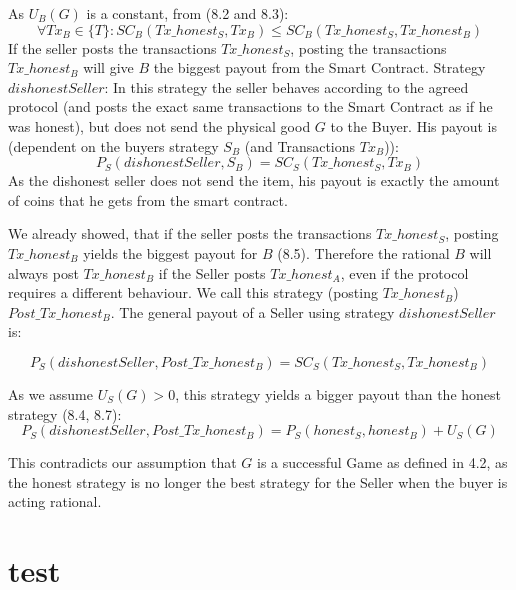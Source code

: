 \documentclass{cacthesis}
\begin{document}
As $U_B(G)$ is a constant, from (8.2 and 8.3):
\begin{equation}
    \forall Tx_B \in \{T\}: SC_B(Tx\_honest_S, Tx_B) \leq SC_B(Tx\_honest_S, Tx\_honest_B)
\end{equation}
If the seller posts the transactions $Tx\_honest_S$, posting the transactions $Tx\_honest_B$ will give $B$ the biggest payout from the Smart Contract.
Strategy $dishonestSeller$: In this strategy the seller behaves according to the agreed protocol (and posts the exact same transactions to the Smart Contract as if he was honest), but does not send the physical good $G$ to the Buyer.\newline
His payout is (dependent on the buyers strategy $S_B$ (and Transactions $Tx_B$)):
\begin{equation}
    P_S(dishonestSeller,S_B) = SC_S(Tx\_honest_S,Tx_B)
\end{equation}
As the dishonest seller does not send the item, his payout is exactly the amount of coins that he gets from the smart contract.\newline

We already showed, that if the seller posts the transactions $Tx\_honest_S$, posting $Tx\_honest_B$ yields the biggest payout for $B$ (8.5).\newline
Therefore the rational $B$ will always post $Tx\_honest_B$ if the Seller posts $Tx\_honest_A$, even if the protocol requires a different behaviour. We call this strategy (posting $Tx\_honest_B$) $Post\_Tx\_honest_B$.\newline
The general payout of a Seller using strategy $dishonestSeller$ is:

\begin{equation}
    P_S(dishonestSeller,Post\_Tx\_honest_B) = SC_S(Tx\_honest_S,Tx\_honest_B)
\end{equation}

As we assume $U_S(G) > 0$, this strategy yields a bigger payout than the honest strategy (8.4, 8.7):
\[P_S(dishonestSeller,Post\_Tx\_honest_B) = P_S(honest_S,honest_B) + U_S(G)\]

This contradicts our assumption that $G$ is a successful Game as defined in 4.2, as the honest strategy is no longer the best strategy for the Seller when the buyer is acting rational.

\chapter{test}
\end{document}
